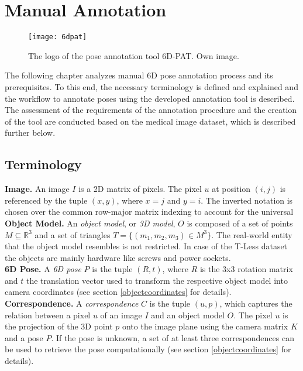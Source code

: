 \chapter{Manual Annotation} \label{chapter:image_pose_annotation}

\begin{figure}[!tbp]
	\centering
    \texttt{[image: 6dpat]}
    \caption{The logo of the pose annotation tool 6D-PAT. Own image.}
    	\label{fig:6dpat_logo}
\end{figure} 

The following chapter analyzes manual 6D pose annotation process and its prerequisites. To this end, the necessary terminology is defined and explained and the workflow to annotate poses using the developed annotation tool is described. The assessment of the requirements of the annotation procedure and the creation of the tool are conducted based on the medical image dataset, which is described further below.

\section{Terminology} \label{section:terminology}

\textbf{Image.} An image $I$ is a 2D matrix of pixels. The pixel $u$ at position $(i, j)$ is referenced by the tuple $(x, y)$, where $x = j$ and $y = i$. The inverted notation is chosen over the common row-major matrix indexing to account for the universal  \\

\noindent\textbf{Object Model.} An \textit{object model}, or \textit{3D model}, $O$ is composed of a set of points $M \subseteq \mathbb{R}^3$ and a set of triangles $T = \{(m_1, m_2, m_3) \in M^3\}$. The real-world entity that the object model resembles is not restricted. In case of the T-Less dataset \cite{tless} the objects are mainly hardware like screws and power sockets. \\

\noindent\textbf{6D Pose.} A \textit{6D pose} $P$ is the tuple $(R, t)$, where $R$ is the 3x3 rotation matrix and $t$ the translation vector used to transform the respective object model into camera coordinates (see section \ref{objectcoordinates} for details). \\

\noindent\textbf{Correspondence.} A \textit{correspondence} $C$ is the tuple $(u, p)$, which captures the relation between a pixel $u$ of an image $I$ and an object model $O$. The pixel $u$ is the projection of the 3D point $p$ onto the image plane using the camera matrix $K$ and a pose $P$. If the pose is unknown, a set of at least three correspondences can be used to retrieve the pose computationally (see section \ref{objectcoordinates} for details). \\

